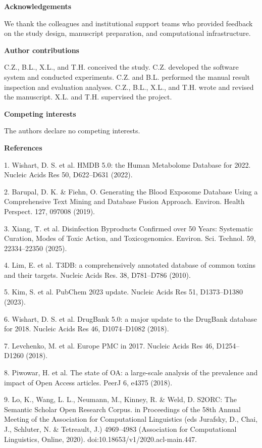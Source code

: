 \documentclass[
]{article}
\begin{document}
\textbf{Acknowledgements}

We thank the colleagues and institutional support teams who provided feedback on the study design, manuscript preparation, and computational infrastructure.

\textbf{Author contributions}

C.Z., B.L., X.L., and T.H. conceived the study. C.Z. developed the
software system and conducted experiments. C.Z. and B.L. performed the
manual result inspection and evaluation analyses. C.Z., B.L., X.L., and
T.H. wrote and revised the manuscript. X.L. and T.H. supervised the
project.

\textbf{Competing interests}

The authors declare no competing interests.

\textbf{References}

1. Wishart, D. S. et al. HMDB 5.0: the Human Metabolome Database for
2022. Nucleic Acids Res 50, D622--D631 (2022).

2. Barupal, D. K. \& Fiehn, O. Generating the Blood Exposome Database
Using a Comprehensive Text Mining and Database Fusion Approach. Environ.
Health Perspect. 127, 097008 (2019).

3. Xiang, T. et al. Disinfection Byproducts Confirmed over 50 Years:
Systematic Curation, Modes of Toxic Action, and Toxicogenomics. Environ.
Sci. Technol. 59, 22334--22350 (2025).

4. Lim, E. et al. T3DB: a comprehensively annotated database of common
toxins and their targets. Nucleic Acids Res. 38, D781--D786 (2010).

5. Kim, S. et al. PubChem 2023 update. Nucleic Acids Res 51,
D1373--D1380 (2023).

6. Wishart, D. S. et al. DrugBank 5.0: a major update to the DrugBank
database for 2018. Nucleic Acids Res 46, D1074--D1082 (2018).

7. Levchenko, M. et al. Europe PMC in 2017. Nucleic Acids Res 46,
D1254--D1260 (2018).

8. Piwowar, H. et al. The state of OA: a large-scale analysis of the
prevalence and impact of Open Access articles. PeerJ 6, e4375 (2018).

9. Lo, K., Wang, L. L., Neumann, M., Kinney, R. \& Weld, D. S2ORC: The
Semantic Scholar Open Research Corpus. in Proceedings of the 58th Annual
Meeting of the Association for Computational Linguistics (eds Jurafsky,
D., Chai, J., Schluter, N. \& Tetreault, J.) 4969--4983 (Association for
Computational Linguistics, Online, 2020).
doi:10.18653/v1/2020.acl-main.447.
\end{document}
